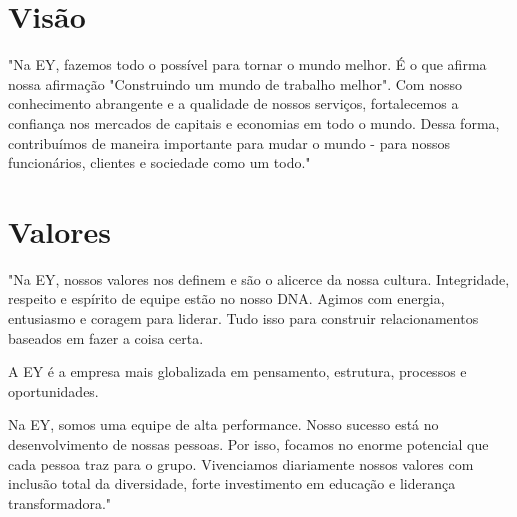 
\section{Visão}
"Na EY, fazemos todo o possível para tornar o mundo melhor. É o que afirma nossa afirmação "Construindo um mundo de trabalho melhor". Com nosso conhecimento abrangente e a qualidade de nossos serviços, fortalecemos a confiança nos mercados de capitais e economias em todo o mundo. Dessa forma, contribuímos de maneira importante para mudar o mundo - para nossos funcionários, clientes e sociedade como um todo."


\section{Valores}
"Na EY, nossos valores nos definem e são o alicerce da nossa cultura. Integridade, respeito e espírito de equipe estão no nosso DNA. Agimos com energia, entusiasmo e coragem para liderar. Tudo isso para construir relacionamentos baseados em fazer a coisa certa.

A EY é a empresa mais globalizada em pensamento, estrutura, processos e oportunidades.

Na EY, somos uma equipe de alta performance. Nosso sucesso está no desenvolvimento de nossas pessoas. Por isso, focamos no enorme potencial que cada pessoa traz para o grupo. Vivenciamos diariamente nossos valores com inclusão total da diversidade, forte investimento em educação e liderança transformadora."

